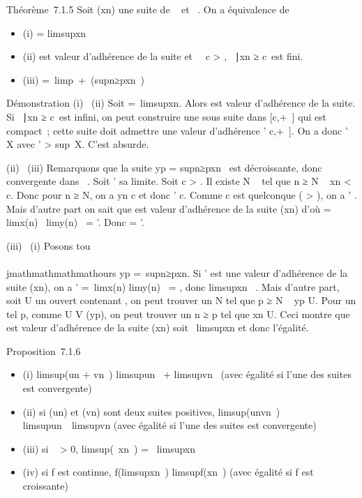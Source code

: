 Théorème~7.1.5 Soit (xn) une suite de
\overline{}~ et \ell \in\overline{}~. On a
équivalence de

\begin{itemize}
\itemsep1pt\parskip0pt
\item
  (i) \ell = limsupxn~
\item
  (ii) \ell est valeur d'adhérence de la suite et
  \forall~~c \textgreater{} \ell, \n \in
  ~∣xn ≥ c\ est
  fini.
\item
  (iii) \ell =\
  limp\rightarrow~+\infty~(supn≥pxn~)
\end{itemize}

Démonstration (i) \rigtharrow~(ii) Soit \ell =\
limsupxn. Alors \ell est valeur d'adhérence de la suite. Si
\n \in \mathbb{N}~∣xn ≥
c\ est infini, on peut construire une sous suite dans
{[}c,+\infty~{]} qui est compact~; cette suite doit admettre une valeur
d'adhérence \ell' \in {[}c,+\infty~{]}. On a donc \ell' \in X avec \ell'
\textgreater{} sup~X. C'est absurde.

(ii) \rigtharrow~(iii) Remarquons que la suite yp
= supn≥pxn~ est
décroissante, donc convergente dans \overline{}~. Soit
\ell' sa limite. Soit c \textgreater{} \ell. Il existe N \in {}~ tel que n ≥ N \rigtharrow~
xn \textless{} c. Donc pour n ≥ N, on a yn \leq c et
donc \ell' \leq c. Comme c est quelconque ( \textgreater{} \ell), on a \ell' \leq \ell.
Mais d'autre part on sait que \ell est valeur d'adhérence de la suite
(xn) d'où \ell = limx\phi(n)~
\leq limy\phi(n)~ = \ell'. Donc \ell = \ell'.

(iii) \rigtharrow~(i) Posons tou\\\\jmathmathmathmathours yp =\
supn≥pxn. Si \ell' est une valeur d'adhérence de la
suite (xn), on a \ell' =\
limx\phi(n) \leq limy\phi(n)~ = \ell,
donc limsupxn~ \leq \ell. Mais d'autre
part, soit U un ouvert contenant \ell, on peut trouver un N tel que p ≥ N \rigtharrow~
yp \in U. Pour un tel p, comme U \in V (yp), on peut
trouver un n ≥ p tel que xn \in U. Ceci montre que \ell est valeur
d'adhérence de la suite (xn) soit \ell \leq\
limsupxn et donc l'égalité.

Proposition~7.1.6

\begin{itemize}
\itemsep1pt\parskip0pt
\item
  (i) limsup(un + vn~)
  \leq limsupun~
  + limsupvn~ (avec égalité si l'une
  des suites est convergente)
\item
  (ii) si (un) et (vn) sont deux suites positives,
  limsup(unvn~)
  \leq limsupun~\
  limsupvn (avec égalité si l'une des suites est
  convergente)
\item
  (iii) si \lambda~ \textgreater{} 0,
  limsup(\lambda~xn~) =
  \lambda~limsupxn~
\item
  (iv) si f est continue,
  f(limsupxn~)
  \leq limsupf(xn~) (avec égalité si f
  est croissante)
\end{itemize}

